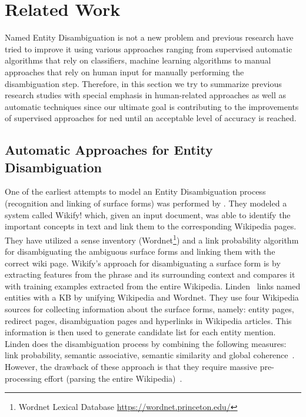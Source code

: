 \section{Related Work}
\label{framework:relatedwork}


Named Entity Disambiguation is not a new problem and previous research have tried to improve it using various approaches ranging from supervised automatic algorithms that rely on classifiers, machine learning algorithms to manual approaches that rely on human input for manually performing the disambiguation step. Therefore, in this section we try to summarize previous research studies with special emphasis in human-related approaches as well as automatic techniques since our ultimate goal is contributing to the improvements of supervised approaches for \ac{ned} until an acceptable level of accuracy is reached. 

\subsection{Automatic Approaches for Entity Disambiguation}
\label{framework:relatedword_automatic}


One of the earliest attempts to model an Entity Disambiguation process (recognition and linking of surface forms) was performed by \cite{8}. They modeled a system called Wikify! which, given an input document, was able to identify the important concepts in text and link them to the corresponding Wikipedia pages. They have utilized a sense inventory (Wordnet\footnote{Wordnet Lexical Database \url{https://wordnet.princeton.edu/}}) and a link probability algorithm for disambiguating the ambiguous surface forms and linking them with the correct wiki page. Wikify's approach for disambiguating a surface form is by extracting features from the phrase and its surrounding context and compares it with training examples extracted from the entire Wikipedia. Linden~\cite{20} links named entities with a KB by unifying Wikipedia and Wordnet. They use four Wikipedia sources for collecting information about the surface forms, namely: entity pages, redirect pages, disambiguation pages and hyperlinks in Wikipedia articles. This information is then used to generate candidate list for each entity mention. Linden does the disambiguation process by combining the following measures: link probability, semantic associative, semantic similarity and global coherence~\cite{20}. However, the drawback of these approach is that they require massive pre-processing effort (parsing the entire Wikipedia)~\cite{9}.

